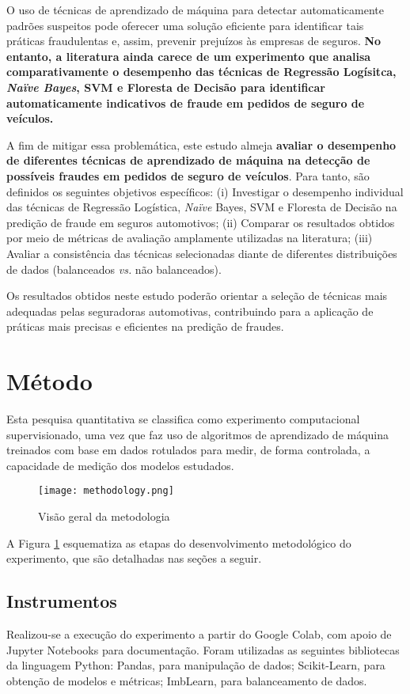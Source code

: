 \documentclass[conference]{IEEEtran}
\begin{document}
O uso de técnicas de aprendizado de máquina para detectar automaticamente padrões suspeitos pode oferecer uma solução eficiente para identificar tais práticas fraudulentas e, assim, prevenir prejuízos às empresas de seguros. \textbf{No entanto,  a literatura ainda carece de um experimento que analisa comparativamente o desempenho das técnicas de Regressão Logísitca, \textit{\textit{Naïve} Bayes}, SVM e Floresta de Decisão para identificar automaticamente indicativos de fraude em pedidos de seguro de veículos.}

A fim de mitigar essa problemática, este estudo almeja \textbf{avaliar o desempenho de diferentes técnicas de aprendizado de máquina na detecção de possíveis fraudes em pedidos de seguro de veículos}. Para tanto, são definidos os seguintes objetivos específicos: (i) Investigar o desempenho individual das técnicas de Regressão Logística, \textit{Naïve} Bayes, SVM e Floresta de Decisão na predição de fraude em seguros automotivos; (ii) Comparar os resultados obtidos por meio de métricas de avaliação amplamente utilizadas na literatura; (iii) Avaliar a consistência das técnicas selecionadas diante de diferentes distribuições de dados (balanceados \textit{vs.} não balanceados).

Os resultados obtidos neste estudo poderão orientar a seleção de técnicas mais adequadas pelas seguradoras automotivas, contribuindo para a aplicação de práticas mais precisas e eficientes na predição de fraudes.

\section{Método}

Esta pesquisa quantitativa se classifica como experimento computacional supervisionado, uma vez que faz uso de algoritmos de aprendizado de máquina treinados com base em dados rotulados para medir, de forma controlada, a capacidade de medição dos modelos estudados.

\begin{figure}[htbp]
  \centering
  \texttt{[image: methodology.png]}
  \caption{Visão geral da metodologia}
  \label{fig:methodology}
\end{figure}

A Figura \ref{fig:methodology} esquematiza as etapas do desenvolvimento metodológico do experimento, que são detalhadas nas seções a seguir.

\subsection{Instrumentos}
Realizou-se a execução do experimento a partir do Google Colab, com apoio de Jupyter Notebooks para documentação. Foram utilizadas as seguintes bibliotecas da linguagem Python: Pandas, para manipulação de dados; Scikit-Learn, para obtenção de modelos e métricas; ImbLearn, para balanceamento de dados.
\end{document}
